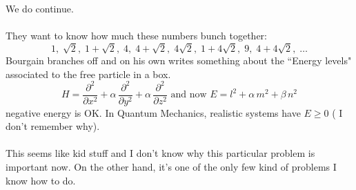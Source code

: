 \documentclass[12pt]{article}
\begin{document}
We do continue. \\ \\
They want to know how much these numbers bunch together: 
$$ 1,\;\sqrt{2},\;  1 + \sqrt{2}, \; 4,\; 4 + \sqrt{2},\; 4 \sqrt{2},\; 1 + 4\sqrt{2}, \; 9, \;4 + 4 \sqrt{2}, \;\dots  $$
Bourgain branches off and on his own writes something about the ``Energy levels" associated to the free particle in a box.
$$
H = \frac{\partial^2}{\partial x^2}+ \alpha \, \frac{\partial^2}{\partial y^2}
+ \alpha \, \frac{\partial^2}{\partial z^2} \text{ and now } E = l^2 + \alpha \, m^2 + \beta \, n^2  $$
negative energy is OK.  In Quantum Mechanics, realistic systems have $E \geq 0$ ( I don't remember why). \\ \\
This seems like kid stuff and I don't know why this particular problem is important now.  On the other hand, it's one of the only few kind of problems I know how to do.

\newpage
\end{document}
